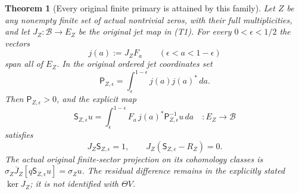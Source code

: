 \documentclass[11pt]{article}
\newtheorem{theorem}{Theorem}[section]
\newcommand{\B}{\mathscr B}\newcommand{\M}{\mathcal M}
\begin{document}
\begin{theorem}[Every original finite primary is attained by this family]
Let $Z$ be any nonempty finite set of actual nontrivial zeros,
with their full multiplicities, and let $J_Z:\B\to E_Z$ be the
original jet map in (T1). For every $0<\epsilon<1/2$ the
vectors
\[
 j(a):=J_ZF_a\qquad(\epsilon<a<1-\epsilon)
\]
span all of $E_Z$. In the original ordered jet coordinates set
\[
 \mathsf P_{Z,\epsilon}
    =\int_\epsilon^{1-\epsilon} j(a)j(a)^*\,da.
 \tag{HU7}
\]
Then $\mathsf P_{Z,\epsilon}>0$, and the explicit map
\[
 \mathsf S_{Z,\epsilon}u
   =\int_\epsilon^{1-\epsilon}
      F_a\,j(a)^*\mathsf P_{Z,\epsilon}^{-1}u\,da
       \quad:E_Z\longrightarrow\B
 \tag{HU8}
\]
satisfies
\[
 J_Z\mathsf S_{Z,\epsilon}=1,\qquad
 J_Z(\mathsf S_{Z,\epsilon}-R_Z)=0.
 \tag{HU9}
\]
The actual original finite-sector projection on its cohomology
classes is
$\sigma_Z\overline J_Z[q\mathsf S_{Z,\epsilon}u]=\sigma_Zu$.
The residual difference remains in the explicitly stated
$\ker J_Z$; it is not identified with $\Theta V$.
\end{theorem}
\end{document}
